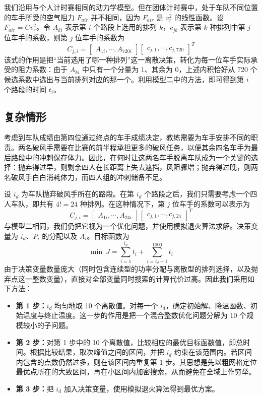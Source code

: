 \documentclass[11pt,a4paper]{ctexart}
\begin{document}
我们沿用与个人计时赛相同的动力学模型。但在团体计时赛中，处于车队不同位置的车手所受的空气阻力 $F_{air}$ 并不相同，因为 $F_{air}$ 是 $v_r^2$ 的线性函数。设 $F_{air}=Cv_r^2$。令 $A_{ki}$ 表示第 $i$ 个路段上选用的排列 $k$，$c_{jk}$ 表示第 $k$ 种排列中第 $j$ 位车手的系数，则第 $j$ 位车手的系数为
\[
C_{j,i}=\begin{bmatrix}A_{1i},\cdots,A_{720i}\end{bmatrix}
\begin{bmatrix}c_{j,1},\cdots,c_{j,720}\end{bmatrix}^{T}
\]
该式的作用是把“当前选用了哪一种排列”这一离散决策，转化为每一位车手实际承受的阻力系数：由于 $A_{ki}$ 中只有一个分量为 1、其余为 0，上述内积恰好从 720 个候选系数中选出与当前排列对应的那一个。利用模型二中的方法，即可得到第 $i$ 个路段的时间 $t_i$。

\subsection{复杂情形}

考虑到车队成绩由第四位通过终点的车手成绩决定，教练需要为车手安排不同的职责。两名破风手需要在比赛的前半程承担更多的破风任务，以便其余四名车手为最后路段中的冲刺保存体力。因此，在何时让这两名车手脱离车队成为一个关键的选择：抛弃得过早，则剩余四人在长距离上失去遮挡，风阻骤增；抛弃得过晚，则两名破风手白白消耗体力，而四人组的冲刺储备不足。

设 $i_d$ 为车队抛弃破风手所在的路段。在第 $i_d$ 个路段之后，我们只需要考虑一个四人车队，即共有 $4!=24$ 种排列。在这种情况下，第 $j$ 位车手的系数可以表示为
\[
C_{j,i}=\begin{bmatrix}A_{1i},\cdots,A_{24i}\end{bmatrix}
\begin{bmatrix}c_{j,1},\cdots,c_{j,24}\end{bmatrix}^{T}
\]
与模型二相同，我们仍把它视为一个优化问题，并使用模拟退火算法求解。决策变量为 $i_d$、$P_i$ 的分配以及 $A_i$。目标函数为
\[
\min\ J=\sum_{i=1}^{i_d}t_i+\sum_{i=i_d+1}^{1000}t_i
\]
由于决策变量数量庞大（同时包含连续型的功率分配与离散型的排列选择，以及抛弃点这一整数变量），直接对全部变量同时搜索的计算代价过高。因此我们采用如下方法：

\begin{itemize}
\item \textbf{第 1 步：}$i_d$ 均匀地取 10 个离散值。对每一个 $i_d$，确定初始解、降温函数、初始温度与终止温度。这一步的作用是把一个混合整数优化问题分解为 10 个规模较小的子问题。
\item \textbf{第 2 步：}对第 1 步中的 10 个离散值，比较相应的最优目标函数值，即总时间。根据比较结果，取次峰值之间的区间，并把 $i_d$ 约束在该范围内。若区间内包含的点数仍然过多，则在该区间内重复第 1 步。其思想是先以粗网格定位最优点所在的大致区间，再在小区间内加密搜索，从而避免在全域上作穷举。
\item \textbf{第 3 步：}把 $i_d$ 加入决策变量，使用模拟退火算法得到最优方案。
\end{itemize}
\end{document}
